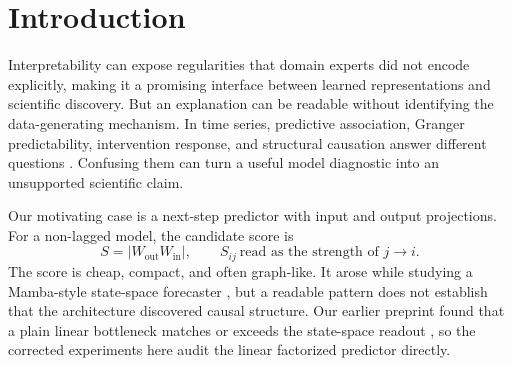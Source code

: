 \begin{abstract}
Readable model weights are tempting evidence about the mechanisms that
generated scientific data. We audit one such candidate: the endpoint-product
score of a next-step time-series predictor. A sequence of initially plausible
architecture, benchmark, intervention, and nonlinearity stories does not
survive controls for direction conventions, lag horizons, label provenance,
data budgets, intervention targets, and classical baselines. Correcting a
source/target transpose and matching lag horizons changes Lorenz-96 PCMCI
AUROC from $0.986$ in our earlier preprint to $\CorrectedPCMCI$. On target-aware, size-matched random forcing,
all four tested methods improve, so the effect is not bottleneck-specific.
In a fixed nonlinearity confirmation, the only gate-passing bottleneck
advantage is identical at every nonlinearity strength, vanishes when the
sample size doubles, and arises because the prediction-tuned Lasso comparator
returns all-zero cross-variable scores. We demonstrate a reproducible falsification protocol on one endpoint-product
score family, with reporting and responsible-use boundaries; transfer to other
interpretability signals remains untested. This negative study illustrates how a readable
predictive representation can remain useful for hypothesis generation without
constituting causal knowledge.
\end{abstract}

\section{Introduction}

Interpretability can expose regularities that domain experts did not encode
explicitly, making it a promising interface between learned representations
and scientific discovery. But an explanation can be readable without
identifying the data-generating mechanism. In time series, predictive
association, Granger predictability, intervention response, and structural
causation answer different questions
\citep{granger1969investigating,pearl2009causality,peters2017elements}.
Confusing them can turn a useful model diagnostic into an unsupported
scientific claim.

Our motivating case is a next-step predictor with input and output
projections. For a non-lagged model, the candidate score is
\begin{equation}
  S=|W_{\mathrm{out}}W_{\mathrm{in}}|,\qquad
  S_{ij}\ \text{read as the strength of }j\rightarrow i.
  \label{eq:score}
\end{equation}
The score is cheap, compact, and often graph-like. It arose while studying a
Mamba-style state-space forecaster \citep{gu2023mamba}, but a readable pattern
does not establish that the architecture discovered causal structure. Our
earlier preprint found that a plain linear bottleneck matches or exceeds the
state-space readout \citep{lade2026prediction}, so the corrected experiments
here audit the linear factorized predictor directly.

